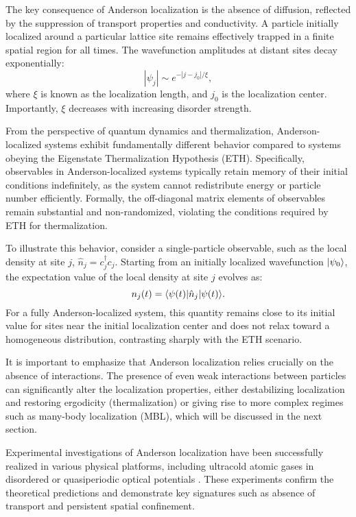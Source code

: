 The key consequence of Anderson localization is the absence of diffusion, reflected by the suppression of transport properties and conductivity. A particle initially localized around a particular lattice site remains effectively trapped in a finite spatial region for all times. The wavefunction amplitudes at distant sites decay exponentially:
\begin{equation}
|\psi_j| \sim e^{-|j-j_0|/\xi},
\end{equation}
where $\xi$ is known as the localization length, and $j_0$ is the localization center. Importantly, $\xi$ decreases with increasing disorder strength.

From the perspective of quantum dynamics and thermalization, Anderson-localized systems exhibit fundamentally different behavior compared to systems obeying the Eigenstate Thermalization Hypothesis (ETH). Specifically, observables in Anderson-localized systems typically retain memory of their initial conditions indefinitely, as the system cannot redistribute energy or particle number efficiently. Formally, the off-diagonal matrix elements of observables remain substantial and non-randomized, violating the conditions required by ETH for thermalization.

To illustrate this behavior, consider a single-particle observable, such as the local density at site $j$, $\hat{n}_j = c_j^\dagger c_j$. Starting from an initially localized wavefunction $\left| \psi_0 \right\rangle$, the expectation value of the local density at site $j$ evolves as:
\begin{equation}
n_j(t) = \bk{\psi(t)}[\hat{n}_j]{\psi(t)}.
\end{equation}
For a fully Anderson-localized system, this quantity remains close to its initial value for sites near the initial localization center and does not relax toward a homogeneous distribution, contrasting sharply with the ETH scenario.

It is important to emphasize that Anderson localization relies crucially on the absence of interactions. The presence of even weak interactions between particles can significantly alter the localization properties, either destabilizing localization and restoring ergodicity (thermalization) or giving rise to more complex regimes such as many-body localization (MBL), which will be discussed in the next section.

Experimental investigations of Anderson localization have been successfully realized in various physical platforms, including ultracold atomic gases in disordered or quasiperiodic optical potentials \cite{billy_direct_2008, roati_anderson_2008}. These experiments confirm the theoretical predictions and demonstrate key signatures such as absence of transport and persistent spatial confinement.

